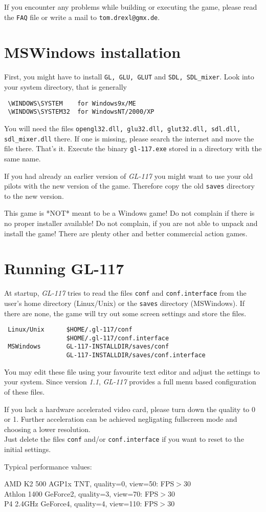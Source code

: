 If you encounter any problems while building or executing the game, please read the \texttt{FAQ}
file or write a mail to \texttt{tom.drexl@gmx.de}.

\section{MSWindows installation}
\label{sec:windows_installation}

First, you might have to install \texttt{GL, GLU, GLUT} and \texttt{SDL, SDL\_mixer}.
Look into your system directory, that is generally
\begin{verbatim}
 \WINDOWS\SYSTEM    for Windows9x/ME
 \WINDOWS\SYSTEM32  for WindowsNT/2000/XP
\end{verbatim}
You will need the files \texttt{opengl32.dll, glu32.dll, glut32.dll, sdl.dll, sdl\_mixer.dll}
there.
If one is missing, please search the internet and move the file there.
That's it. Execute the binary \texttt{gl-117.exe} stored in a directory with the same name.

If you had already an earlier version of \emph{GL-117} you might want to use your
old pilots with the new version of the game. Therefore copy the old
\texttt{saves} directory to the new version.

This game is *NOT* meant to be a Windows game! Do not complain if there is no proper
installer available! Do not complain, if you are not able to unpack and install the game!
There are plenty other and better commercial action games.

\section{Running GL-117}
\label{sec:running_gl117}

At startup, \emph{GL-117} tries to read the files \texttt{conf} and \texttt{conf.interface}
from the user's home directory (Linux/Unix) or the \texttt{saves} directory (MSWindows).
If there are none, the game will try out some screen settings and store the files.
\begin{verbatim}
 Linux/Unix      $HOME/.gl-117/conf
                 $HOME/.gl-117/conf.interface
 MSWindows       GL-117-INSTALLDIR/saves/conf
                 GL-117-INSTALLDIR/saves/conf.interface
\end{verbatim}

You may edit these file using your favourite text editor and adjust the settings
to your system. Since version \textit{1.1}, \emph{GL-117} provides a full menu based configuration
of these files.

If you lack a hardware accelerated video card, please turn down the
quality to 0 or 1. Further acceleration can be achieved negligating fullscreen mode
and choosing a lower resolution.\\
Just delete the files \texttt{conf} and/or \texttt{conf.interface}
if you want to reset to the initial settings.

Typical performance values:

 AMD K2 500 AGP1x TNT, quality=0, view=50: FPS$>$30\\
 Athlon 1400 GeForce2, quality=3, view=70: FPS$>$30\\
 P4 2.4GHz GeForce4, quality=4, view=110: FPS$>$30
